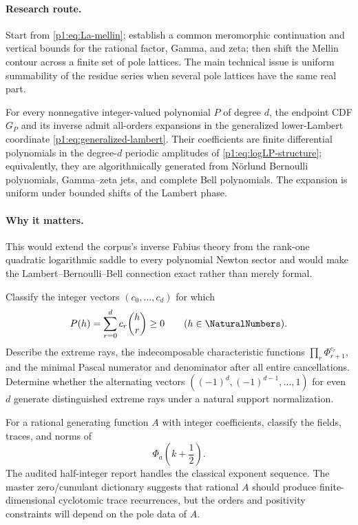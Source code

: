 \documentclass[11pt,oneside]{article}
\numberwithin{equation}{section}
\theoremstyle{definition}
\theoremstyle{remark}
\begin{document}
\paragraph{Research route.}
Start from \eqref{p1:eq:La-mellin}; establish a common meromorphic continuation and vertical
bounds for the rational factor, Gamma, and zeta; then shift the Mellin contour across a
finite set of pole lattices.  The main technical issue is uniform summability of the residue
series when several pole lattices have the same real part.

\begin{conjecture}
\label{p1:conj:inverse-transseries}
For every nonnegative integer-valued polynomial $P$ of degree $d$, the endpoint CDF $G_P$ and
its inverse admit all-orders expansions in the generalized lower-Lambert coordinate
\eqref{p1:eq:generalized-lambert}.  Their coefficients are finite differential polynomials in
the degree-$d$ periodic amplitudes of \eqref{p1:eq:logLP-structure}; equivalently, they are
algorithmically generated from N\"orlund Bernoulli polynomials, Gamma--zeta jets, and
complete Bell polynomials.  The expansion is uniform under bounded shifts of the Lambert
phase.
\end{conjecture}

\paragraph{Why it matters.}
This would extend the corpus's inverse Fabius theory from the rank-one quadratic logarithmic
saddle to every polynomial Newton sector and would make the Lambert--Bernoulli--Bell
connection exact rather than merely formal.

\begin{problem}
\label{p1:prob:newton-cone}
Classify the integer vectors $(c_0,\ldots,c_d)$ for which
\[
 P(h)=\sum_{r=0}^{d}c_r\binom hr\ge0
 \qquad(h\in\NaturalNumbers).
\]
Describe the extreme rays, the indecomposable characteristic functions
$\prod_r\Phi_{r+1}^{c_r}$, and the minimal Pascal numerator and denominator after all entire
cancellations.  Determine whether the alternating vectors
$((-1)^d,(-1)^{d-1},\ldots,1)$ for even $d$ generate distinguished extreme rays under a
natural support normalization.
\end{problem}

\begin{problem}
For a rational generating function $A$ with integer coefficients, classify the fields,
traces, and norms of
\[
 \Phi_a\!\left(k+\frac12\right).
\]
The audited half-integer report handles the classical exponent sequence.  The master
zero/cumulant dictionary suggests that rational $A$ should produce finite-dimensional
cyclotomic trace recurrences, but the orders and positivity constraints will depend on the
pole data of $A$.
\end{problem}
\end{document}
